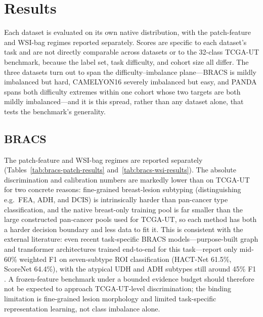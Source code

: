 \documentclass[11pt]{article}
\begin{document}
\section{Results}
\label{sec:results}
Each dataset is evaluated on its own native distribution, with the patch-feature and WSI-bag regimes reported separately. Scores are specific to each dataset's task and are not directly comparable across datasets or to the 32-class TCGA-UT benchmark, because the label set, task difficulty, and cohort size all differ. The three datasets turn out to span the difficulty--imbalance plane---BRACS is mildly imbalanced but hard, CAMELYON16 severely imbalanced but easy, and PANDA spans both difficulty extremes within one cohort whose two targets are both mildly imbalanced---and it is this spread, rather than any dataset alone, that tests the benchmark's generality.

\subsection{BRACS}
The patch-feature and WSI-bag regimes are reported separately (Tables~\ref{tab:bracs-patch-results} and~\ref{tab:bracs-wsi-results}). The absolute discrimination and calibration numbers are markedly lower than on TCGA-UT for two concrete reasons: fine-grained breast-lesion subtyping (distinguishing e.g.\ FEA, ADH, and DCIS) is intrinsically harder than pan-cancer type classification, and the native breast-only training pool is far smaller than the large constructed pan-cancer pools used for TCGA-UT, so each method has both a harder decision boundary and less data to fit it. This is consistent with the external literature: even recent task-specific BRACS models---purpose-built graph and transformer architectures trained end-to-end for this task---report only mid-\num{60}\% weighted F1 on seven-subtype ROI classification (HACT-Net \num{61.5}\%, ScoreNet \num{64.4}\%), with the atypical UDH and ADH subtypes still around \num{45}\% F1 \citep{pati2022hierarchical,stegmuller2023scorenet}. A frozen-feature benchmark under a bounded evidence budget should therefore not be expected to approach TCGA-UT-level discrimination; the binding limitation is fine-grained lesion morphology and limited task-specific representation learning, not class imbalance alone.

\begin{table}[ht]
  \centering
  \caption{BRACS native patch-feature test results (accuracy, balanced accuracy, and macro F1) for validation-selected configurations, mean $\pm$ standard deviation across patient-disjoint seeds.}
  \label{tab:bracs-patch-results}
\end{table}
\end{document}
